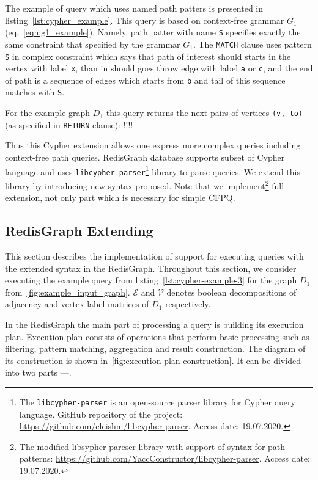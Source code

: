 The example of query which uses named path patters is presented in listing~\ref{lst:cypher_example}. 
This query is based on context-free grammar $G_1$ (eq.~\ref{eqn:g1_example}). 
Namely, path patter with name \texttt{S} specifies exactly the same constraint that specified by the grammar $G_1$. 
The \texttt{MATCH} clause uses pattern \texttt{S} in complex constraint which says that path of interest should starts in the vertex with label \texttt{x}, than in should goes throw edge with label \texttt{a} or \texttt{c}, and the end of path is a sequence of edges which starts from \texttt{b} and tail of this sequence matches with \texttt{S}.  

For the example graph $D_1$ this query returns the next pairs of vertices \texttt{(v, to)} (as specified in \texttt{RETURN} clause): !!!!

Thus this Cypher extension allows one express more complex queries including context-free path queries.
RedisGraph database supports subset of Cypher language and uses \texttt{libcypher-parser}\footnote{The \texttt{libcypher-parser} is an open-source parser library for Cypher query language. GitHub repository of the project: \url{https://github.com/cleishm/libcypher-parser}. Access date: 19.07.2020.} library to parse queries.
We extend this library by introducing new syntax proposed.
Note that we implement\footnote{The modified libsypher-pareser library with support of syntax for path patterns: \url{https://github.com/YaccConstructor/libcypher-parser}. Access date: 19.07.2020.} full extension, not only part which is necessary for simple CFPQ. 

\subsection{RedisGraph Extending}

This section describes the implementation of support for executing queries with the extended syntax in the RedisGraph. Throughout this section, we consider executing the example query from listing~\autoref{lst:cypher-example-3} for the graph $D_1$ from~\autoref{fig:example_input_graph}. $\mathcal{E}$ and $\mathcal{V}$ denotes boolean decompositions of adjacency and vertex label matrices of $D_1$ respectively. 

In the RedisGraph the main part of processing a query is building its execution plan. Execution plan consists of operations that perform basic processing such as filtering, pattern matching, aggregation and result construction. The diagram of its construction is shown in~\autoref{fig:execution-plan-construction}. It can be divided into two parts ---.

